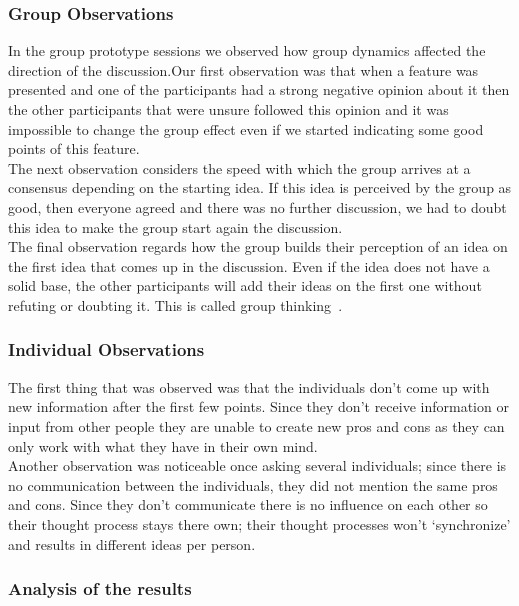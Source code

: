 \documentclass[main.tex]{subfiles}
\begin{document}
\subsubsection{Group Observations}

In the group prototype sessions we observed how group dynamics affected the direction of the discussion.Our first observation was that when a feature was presented and one of the participants had a strong negative opinion about it then the other participants that were unsure followed this opinion and it was impossible to change the group effect even if we started indicating some good points of this feature. \\

The next observation considers the speed with which the group arrives at a consensus depending on the starting idea. If this idea is perceived by the group as good, then everyone agreed and there was no further discussion, we had to doubt this idea to make the group start again the discussion.\\

The final observation regards how the group builds their perception of an idea on the first idea that comes up in the discussion. Even if the idea does not have a solid base, the other participants will add their ideas on the first one without refuting or doubting it. This is called group thinking~\cite{janis}.

\subsubsection{Individual Observations}
The first thing that was observed was that the individuals don't come up with new information after the first few points. Since they don't receive information or input from other people they are unable to create new pros and cons as they can only work with what they have in their own mind. \\
Another observation was noticeable once asking several individuals; since there is no communication between the individuals, they did not mention the same pros and cons. Since they don't communicate there is no influence on each other so their thought process stays there own; their thought processes won't `synchronize' and results in different ideas per person.

%
\subsubsection{Analysis of the results}
\end{document}

